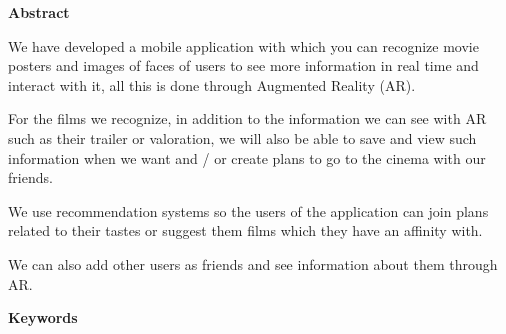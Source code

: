
\newpage

\thispagestyle{empty}

\begin{center}

{\bf \Huge Abstract}

  \end{center}
\vspace{1cm}
\begin{flushleft}
We have developed a mobile application with which you can
 recognize movie posters and images of faces of users to see more
 information in real time and interact with it, all this is done
 through Augmented Reality (AR).

For the films we recognize, in addition to the information
 we can see with AR such as their trailer or
 valoration, we will also be able to save and view such
 information when we want and / or create plans to go to the
 cinema with our friends.

We use recommendation systems so the users of the application can join plans related to
their tastes or suggest them films which they have an affinity with.

We can also add other users as friends and see information about
them through AR.
\end{flushleft}
\vspace{1cm}

\begin{center}

  {\bf \Large Keywords}
  
     \end{center}
  
     \vspace{0.5cm}
     
